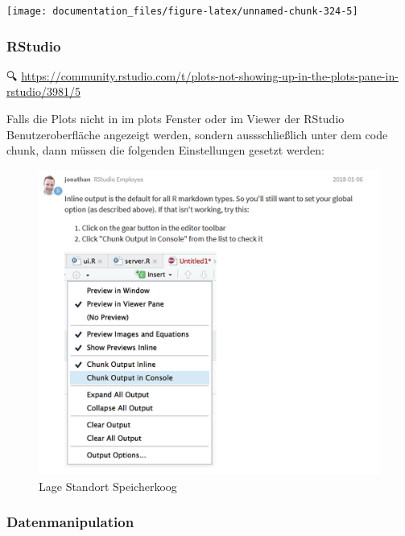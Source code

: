 \documentclass[
]{article}
\begin{document}
\begin{center}\texttt{[image: documentation\_files/figure-latex/unnamed-chunk-324-5]} \end{center}

\hypertarget{rstudio-1}{%
\subsubsection{RStudio}\label{rstudio-1}}

🔍 \url{https://community.rstudio.com/t/plots-not-showing-up-in-the-plots-pane-in-rstudio/3981/5}

Falls die Plots nicht in im plots Fenster oder im Viewer der RStudio Benutzeroberfläche angezeigt werden, sondern aussschließlich unter dem code chunk, dann müssen die folgenden Einstellungen gesetzt werden:

\begin{figure}

{\centering \includegraphics[width=1\linewidth]{images/047} 

}

\caption{Lage Standort Speicherkoog}\label{fig:unnamed-chunk-325}
\end{figure}

\hypertarget{datenmanipulation}{%
\subsubsection{Datenmanipulation}\label{datenmanipulation}}
\end{document}
